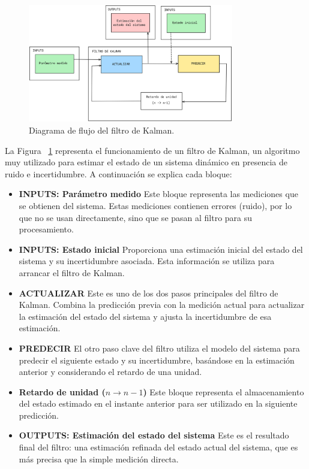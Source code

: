 \documentclass[11pt,spanish,listoffigures,listoftables]{tfgetsinf}
\begin{document}
\begin{figure}[H]
   \centering
   \includegraphics[width=0.8\textwidth]{images/estado_del_arte/filtro_de_kalman.png}
   \caption{Diagrama de flujo del filtro de Kalman.}
   \label{fig:filtro_de_kalman}
\end{figure}

La Figura ~\ref{fig:filtro_de_kalman} representa el funcionamiento de un filtro de Kalman, un algoritmo muy utilizado para estimar el estado de un sistema dinámico en presencia de ruido e incertidumbre. A continuación se explica cada bloque:

\begin{itemize}
   \item \textbf{INPUTS: Parámetro medido}
   Este bloque representa las mediciones que se obtienen del sistema. Estas mediciones contienen errores (ruido), por lo que no se usan directamente, sino que se pasan al filtro para su procesamiento.

   \item \textbf{INPUTS: Estado inicial}
   Proporciona una estimación inicial del estado del sistema y su incertidumbre asociada. Esta información se utiliza para arrancar el filtro de Kalman.

   \item \textbf{ACTUALIZAR}
   Este es uno de los dos pasos principales del filtro de Kalman. Combina la predicción previa con la medición actual para actualizar la estimación del estado del sistema y ajusta la incertidumbre de esa estimación.

   \item \textbf{PREDECIR}
   El otro paso clave del filtro utiliza el modelo del sistema para predecir el siguiente estado y su incertidumbre, basándose en la estimación anterior y considerando el retardo de una unidad.

   \item \textbf{Retardo de unidad (\(n \rightarrow n{-}1\))}
   Este bloque representa el almacenamiento del estado estimado en el instante anterior para ser utilizado en la siguiente predicción.

   \item \textbf{OUTPUTS: Estimación del estado del sistema}
   Este es el resultado final del filtro: una estimación refinada del estado actual del sistema, que es más precisa que la simple medición directa.
\end{itemize}
\end{document}
